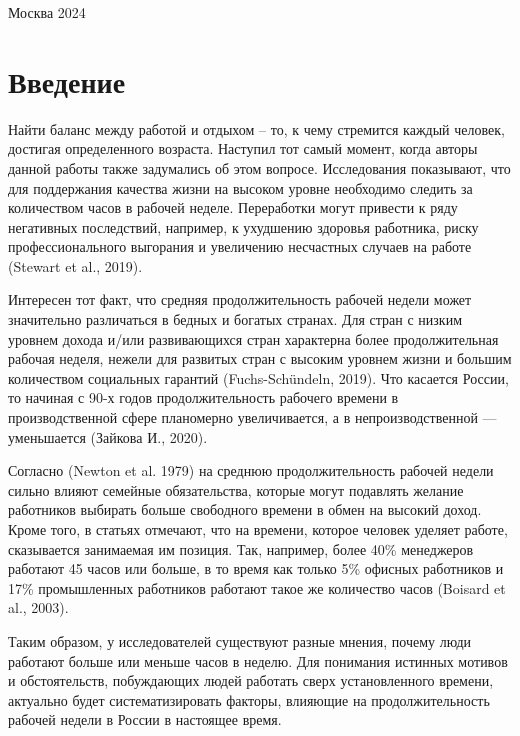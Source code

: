 \documentclass[12pt, a4paper]{article}
\begin{document}
	\normalsize{ 
		\hfill\break\hfill\break\hfill\break\hfill\break\hfill\break\hfill\break\hfill\break\hfill\break\hfill\break\hfill\break\hfill\break\hfill\break\hfill\break\hfill\break\hfill\break
		\hfill \break
		\hfill \break
		\begin{center} Москва 2024 \end{center}
		\thispagestyle{empty} %
		
		\newpage
		\section{Введение}
		
		Найти баланс между работой и отдыхом – то, к чему стремится каждый человек, достигая определенного возраста. Наступил тот самый момент, когда авторы данной работы также задумались об этом вопросе. Исследования показывают, что для поддержания качества жизни на высоком уровне необходимо следить за количеством часов в рабочей неделе. Переработки могут привести к ряду негативных последствий, например, к ухудшению здоровья работника, риску профессионального выгорания и увеличению несчастных случаев на работе (Stewart et al., 2019).
		
		Интересен тот факт, что средняя продолжительность рабочей недели может значительно различаться в бедных и богатых странах. Для стран с низким уровнем дохода и/или развивающихся стран характерна более продолжительная рабочая неделя, нежели для развитых стран с высоким уровнем жизни и большим количеством социальных гарантий (Fuchs-Schündeln, 2019). Что касается России, то начиная с 90-х годов продолжительность рабочего времени в производственной сфере планомерно увеличивается, а в непроизводственной — уменьшается (Зайкова И., 2020).
		
		Согласно (Newton et al. 1979) на среднюю продолжительность рабочей недели сильно влияют семейные обязательства, которые могут подавлять желание работников выбирать больше свободного времени в обмен на высокий доход. Кроме того, в статьях отмечают, что на времени, которое человек уделяет работе, сказывается занимаемая им позиция. Так, например, более 40\% менеджеров работают 45 часов или больше, в то время как только 5\% офисных работников и 17\% промышленных работников работают такое же количество часов (Boisard et al., 2003).
		
		Таким образом, у исследователей существуют разные мнения, почему люди работают больше или меньше часов в неделю. Для понимания истинных мотивов и обстоятельств, побуждающих людей работать сверх установленного времени, актуально будет систематизировать факторы, влияющие на продолжительность рабочей недели в России в настоящее время.
		
}
\end{document}
